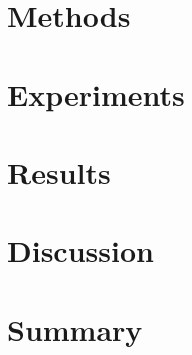 \documentclass[final,5p]{elsarticle}
\begin{document}



\section{Methods} \label{methods}




\section{Experiments} \label{experiments}




\section{Results} \label{results}




\section{Discussion} \label{discussion}




\section{Summary} \label{summary}
\end{document}
